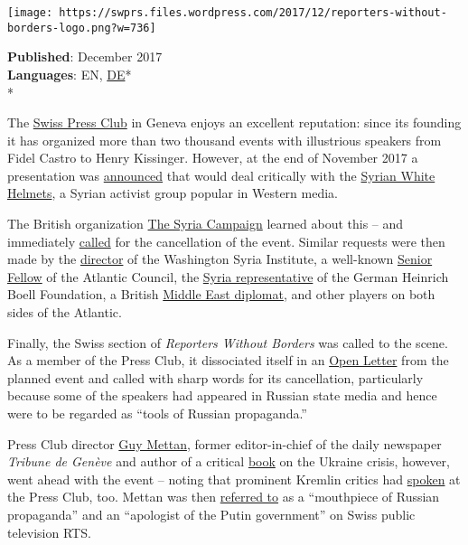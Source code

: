 \texttt{[image: https://swprs.files.wordpress.com/2017/12/reporters-without-borders-logo.png?w=736]}

\textbf{Published}: December 2017\\
\textbf{Languages}: EN,
\href{https://swprs.org/die-grenzen-der-pressefreiheit/}{DE}*\\
*

The \href{http://pressclub.ch/?lang=en}{Swiss Press Club} in Geneva
enjoys an excellent reputation: since its founding it has organized more
than two thousand events with illustrious speakers from Fidel Castro to
Henry Kissinger. However, at the end of November 2017 a presentation was
\href{http://pressclub.ch/they-dont-care-about-us-white-helmets-true-agenda/?lang=en}{announced}
that would deal critically with the
\href{https://en.wikipedia.org/wiki/White_Helmets_(Syrian_Civil_War)}{Syrian
White Helmets}, a Syrian activist group popular in Western media.

The British organization
\href{https://www.alternet.org/world/inside-shadowy-pr-firm-thats-driving-western-opinion-towards-regime-change-syria}{The
Syria Campaign} learned about this -- and immediately
\href{https://twitter.com/thesyriacmpgn/status/932700267891580928}{called}
for the cancellation of the event. Similar requests were then made by
the \href{https://twitter.com/vszyb/status/932806799388020736}{director}
of the Washington Syria Institute, a well-known
\href{https://twitter.com/EliotHiggins/status/932887474925432832}{Senior
Fellow} of the Atlantic Council, the
\href{https://twitter.com/BenteScheller/status/932892645831127040}{Syria
representative} of the German Heinrich Boell Foundation, a British
\href{https://twitter.com/BenJarlath/status/932644417944604672}{Middle
East diplomat}, and other players on both sides of the Atlantic.

Finally, the Swiss section of \emph{Reporters Without Borders} was
called to the scene. As a member of the Press Club, it dissociated
itself in an
\href{https://www.tdg.ch/geneve/actu-genevoise/Guy-Mettan-somme-d-annuler-une-conference/story/14091151}{Open
Letter} from the planned event and called with sharp words for its
cancellation, particularly because some of the speakers had appeared in
Russian state media and hence were to be regarded as ``tools of Russian
propaganda.''

Press Club director \href{https://fr.wikipedia.org/wiki/Guy_Mettan}{Guy
Mettan}, former editor-in-chief of the daily newspaper \emph{Tribune de
Genève} and author of a critical
\href{https://www.amazon.de/Russie-Occident-une-guerre-mille-ans/dp/2940523185}{book}
on the Ukraine crisis, however, went ahead with the event -- noting that
prominent Kremlin critics had
\href{https://www.rt.com/news/411373-white-helmets-switzerland-rsf/}{spoken}
at the Press Club, too. Mettan was then
\href{https://www.rts.ch/info/suisse/9126243-guy-mettan-a-nouveau-accuse-de-servir-de-relais-a-la-propagande-russe.html}{referred
to} as a ``mouthpiece of Russian propaganda'' and an ``apologist of the
Putin government'' on Swiss public television RTS.

